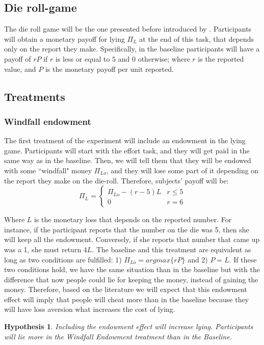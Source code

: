 \documentclass[12pt,final]{article}
\newtheorem{hypothesis}{Hypothesis}
\begin{document}
\subsection{Die roll-game}
The die roll game will be the one presented before introduced by \citet{Fischbacher2013}. Participants will obtain a monetary payoff for lying $\Pi_L$ at the end of this task, that depends only on the report they make. Specifically, in the baseline participants will have a payoff of $rP$ if $r$ is less or equal to 
$5$ and $0$ otherwise; where $r$ is the reported value, and $P$ is the monetary payoff per unit reported.

\subsection{Treatments}

\subsubsection{Windfall endowment}

The first treatment of the experiment will include an endowment in the lying game. Participants will start with the effort task, and they will get paid in the same way as in the baseline. Then, we will tell them that they will be endowed with some ``windfall" money $\Pi_{Lo}$, and they will lose some part of it depending on the report they make on the die-roll. Therefore, subjects' payoff  will be:
\[\Pi_L =
\begin{cases} 
	\Pi_{Lo}-(r-5)L & r\leq 5 \\
	0 & r=6	
\end{cases}\]

Where $L$ is the monetary loss that depends on the reported number. For instance, if the participant reports that the number on the die was 5, then she will keep all the endowment. Conversely, if she reports that number that came up was a 1, she must return $4L$. The baseline and this treatment are equivalent as long as two conditions are fulfilled: 1) $\Pi_{Lo}=argmax \{rP\}$ and 2) $P=L$. If these two conditions hold, we have the same situation than in the baseline but with the difference that now people could lie for keeping the money, instead of gaining the money. Therefore, based on the literature we will expect that this endowment effect will imply that people will cheat more than in the baseline because they will have loss aversion what increases the cost of lying.


\begin{hypothesis}
Including the endowment effect will increase lying. Participants will lie more in the Windfall Endowment treatment than in the Baseline.
\end{hypothesis}
\end{document}
